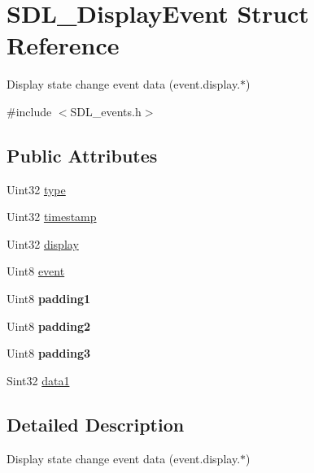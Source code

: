 \hypertarget{structSDL__DisplayEvent}{}\section{S\+D\+L\+\_\+\+Display\+Event Struct Reference}
\label{structSDL__DisplayEvent}


Display state change event data (event.\+display.$\ast$)  




{\ttfamily \#include $<$S\+D\+L\+\_\+events.\+h$>$}

\subsection*{Public Attributes}
\begin{DoxyCompactItemize}
\item 
Uint32 \hyperlink{structSDL__DisplayEvent_a5f4993ce9c5289a2ac046ae7a6dff544}{type}
\item 
Uint32 \hyperlink{structSDL__DisplayEvent_a6c4cd9f63a2ff62032602193c9bf605d}{timestamp}
\item 
Uint32 \hyperlink{structSDL__DisplayEvent_af7159e813fb168a2fdfe5070e6026a39}{display}
\item 
Uint8 \hyperlink{structSDL__DisplayEvent_a4850a90c06e18146d6a2ac235cdd7336}{event}
\item 
\mbox{\label{structSDL__DisplayEvent_a8a6937d7483828f3b9ac68fb79963e33}} 
Uint8 {\bfseries padding1}
\item 
\mbox{\label{structSDL__DisplayEvent_afe4ffe1364f1a29457636c8b74c7a3ce}} 
Uint8 {\bfseries padding2}
\item 
\mbox{\label{structSDL__DisplayEvent_aa4de9fba8f58fedb949894741ab0552b}} 
Uint8 {\bfseries padding3}
\item 
Sint32 \hyperlink{structSDL__DisplayEvent_a4feb7329af16a060cc16d539e5cb13b5}{data1}
\end{DoxyCompactItemize}


\subsection{Detailed Description}
Display state change event data (event.\+display.$\ast$) 

